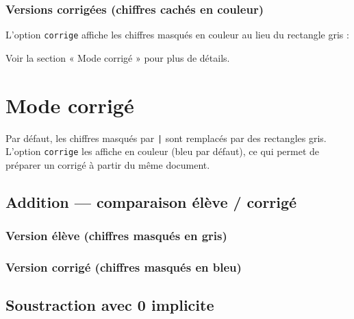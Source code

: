 \documentclass[11pt,a4paper]{article}
\begin{document}
\subsubsection{Versions corrigées (chiffres cachés en couleur)}

L'option \verb!corrige! affiche les chiffres masqués en couleur
au lieu du rectangle gris :

\begin{center}
\end{center}

Voir la section « Mode corrigé » pour plus de détails.

\section{Mode corrigé}

Par défaut, les chiffres masqués par \verb!|! sont remplacés par
des rectangles gris. L'option \verb!corrige! les affiche en
couleur (bleu par défaut), ce qui permet de préparer un corrigé
à partir du même document.

\subsection{Addition — comparaison élève / corrigé}

\subsubsection{Version élève (chiffres masqués en gris)}

\begin{center}
\end{center}

\subsubsection{Version corrigé (chiffres masqués en bleu)}

\begin{center}
\end{center}

\subsection{Soustraction avec 0 implicite}
\end{document}
